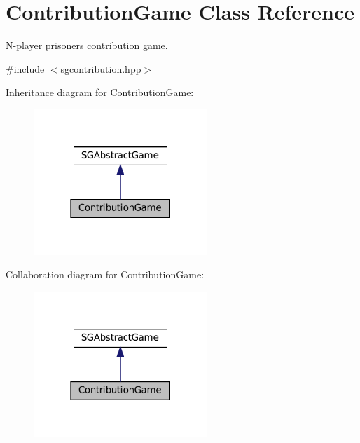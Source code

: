 \hypertarget{classContributionGame}{}\section{Contribution\+Game Class Reference}
\label{classContributionGame}


N-\/player prisoners\textquotesingle{} contribution game.  




{\ttfamily \#include $<$sgcontribution.\+hpp$>$}



Inheritance diagram for Contribution\+Game\+:
\nopagebreak
\begin{figure}[H]
\begin{center}
\leavevmode
\includegraphics[width=186pt]{classContributionGame__inherit__graph}
\end{center}
\end{figure}


Collaboration diagram for Contribution\+Game\+:
\nopagebreak
\begin{figure}[H]
\begin{center}
\leavevmode
\includegraphics[width=186pt]{classContributionGame__coll__graph}
\end{center}
\end{figure}
